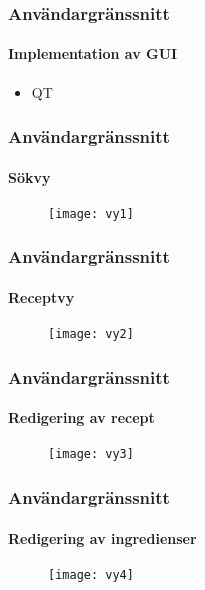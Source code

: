 \begin{frame}
  \frametitle{Användargränssnitt}
  \framesubtitle{Implementation av GUI}
  \begin{itemize}
  \item QT
  \end{itemize}
\end{frame}

\begin{frame}[c]
  \frametitle{Användargränssnitt}
  \framesubtitle{Sökvy}
  \begin{figure}
    \texttt{[image: vy1]}
  \end{figure}
\end{frame}

\begin{frame}[c]
  \frametitle{Användargränssnitt}
  \framesubtitle{Receptvy}
  \begin{figure}
    \texttt{[image: vy2]}
  \end{figure}
\end{frame}

\begin{frame}[c]
  \frametitle{Användargränssnitt}
  \framesubtitle{Redigering av recept}
  \begin{figure}
    \texttt{[image: vy3]}
  \end{figure}
\end{frame}

\begin{frame}[c]
  \frametitle{Användargränssnitt}
  \framesubtitle{Redigering av ingredienser}
  \begin{figure}
    \texttt{[image: vy4]}
  \end{figure}
\end{frame}


